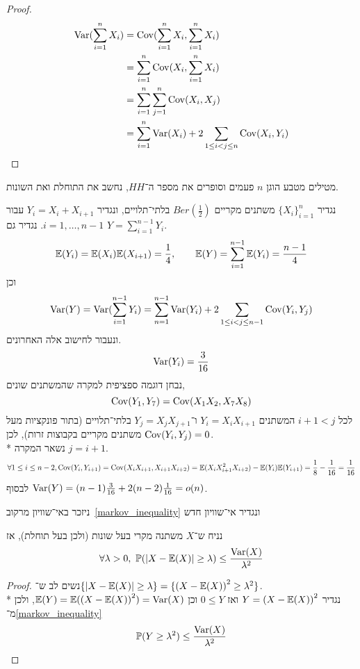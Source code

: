 \begin{proof}
	\begin{align*}
		\operatorname{Var}(\sum_{i = 1}^{n} X_i)
		& = \operatorname{Cov}(\sum_{i = 1}^{n} X_i, \sum_{i = 1}^{n} X_i) \\
		& = \sum_{i = 1}^n \operatorname{Cov}(X_i, \sum_{i = 1}^{n} X_i) \\
		& = \sum_{i = 1}^n \sum_{j = 1}^n \operatorname{Cov}(X_i, X_j) \\
		& = \sum_{i = 1}^{n} \operatorname{Var}(X_i) + 2 \sum_{1 \le i < j \le n} \operatorname{Cov}(X_i, Y_i)
	\end{align*}
\end{proof}
\begin{example}
	מטילים מטבע הוגן $n$ פעמים וסופרים את מספר ה־$HH$, נחשב את התוחלת ואת השונות.

	נגדיר ${\{X_i\}}_{i = 1}^n$ משתנים מקריים $Ber(\frac{1}{2})$ בלתי־תלויים, ונגדיר $Y_i = X_i + X_{i + 1}$ עבור $i = 1, \dots, n - 1$.
	נגדיר גם $Y = \sum_{i = 1}^{n - 1} Y_i$.
	\[
		\mathbb{E}(Y_i) = \mathbb{E}(X_i) \mathbb{E}(X_{i + 1}) = \frac{1}{4},
		\qquad
		\mathbb{E}(Y) = \sum_{i = 1}^{n - 1} \mathbb{E}(Y_i) = \frac{n - 1}{4}
	\]
	וכן
	\[
		\operatorname{Var}(Y)
		= \operatorname{Var}(\sum_{i = 1}^{n - 1} Y_i)
		= \sum_{n = 1}^{n - 1} \operatorname{Var}(Y_i) + 2 \sum_{1 \le i < j \le n - 1} \operatorname{Cov}(Y_i, Y_j)
	\]
	ונעבור לחישוב אלה האחרונים.
	\[
		\operatorname{Var}(Y_i) = \frac{3}{16}
	\]
	נבחן דוגמה ספציפית למקרה שהמשתנים שונים,
	\[
		\operatorname{Cov}(Y_1, Y_7)
		= \operatorname{Cov}(X_1 X_2, X_7 X_8)
	\]
	לכל $i + 1 < j$ המשתנים $Y_i = X_i X_{i + 1}$ ו־$Y_j = X_j X_{j + 1}$ בלתי־תלויים (בתור פונקציות מעל משתנים מקריים בקבוצות זרות), לכן $\operatorname{Cov}(Y_i, Y_j) = 0$. \\*
	נשאר המקרה $j = i + 1$.
	\[
		\forall 1 \le i \le n - 2, \operatorname{Cov}(Y_i, Y_{i + 1})
		= \operatorname{Cov}(X_i X_{i + 1}, X_{i + 1} X_{i + 2})
		= \mathbb{E}(X_i X_{i + 1}^2 X_{i + 2}) - \mathbb{E}(Y_i)\mathbb{E}(Y_{i + 1})
		= \frac{1}{8} - \frac{1}{16}
		= \frac{1}{16}
	\]
	לבסוף $\operatorname{Var}(Y) = (n - 1) \frac{3}{16} + 2(n - 2) \frac{1}{16} = o(n)$.
\end{example}
ניזכר באי־שוויון מרקוב\ \ref{markov_inequality} ונגדיר אי־שוויון חדש
\begin{theorem}
	נניח ש־$X$ משתנה מקרי בעל שונות (ולכן בעל תוחלת), אז
	\[
		\forall \lambda > 0,\ 
		\PP(|X - \EE(X)| \ge \lambda) \le \frac{\var(X)}{\lambda^2}
	\]
\end{theorem}
\begin{proof}
	נשים לב ש־$\{ |X - \mathbb{E}(X)| \ge \lambda \} = \{ {(X - \mathbb{E}(X))}^2 \ge \lambda^2 \}$. \\*
	נגדיר $Y = {(X - \mathbb{E}(X))}^2$ ואז $0 \le Y$ וכן $\mathbb{E}(Y) = \mathbb{E}({(X - \mathbb{E}(X))}^2) = \operatorname{Var}(X)$, ולכן מ־\ref{markov_inequality}
	\[
		\mathbb{P}(Y \ge \lambda^2) \le \frac{\operatorname{Var}(X)}{\lambda^2}
	\]
\end{proof}
